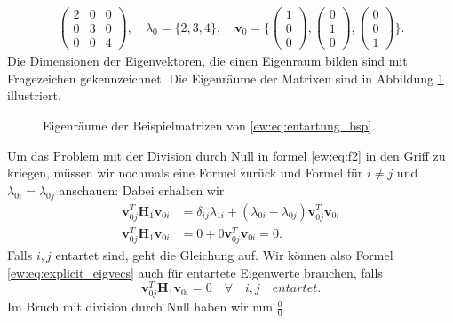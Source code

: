 \begin{align}
    \begin{pmatrix}
        2 & 0 & 0\\
        0 & 3 & 0\\
        0 & 0 & 4
    \end{pmatrix},
    \quad
    \lambda_0 = \{2, 3, 4\},
    \quad
    \bm v_0 = \{
    \begin{pmatrix}
        1\\
        0\\
        0
    \end{pmatrix},
    \begin{pmatrix}
        0\\
        1\\
        0
    \end{pmatrix},
    \begin{pmatrix}
        0\\
        0\\
        1
    \end{pmatrix}
    \}.
\end{align} \label{ew:eq:entartung_bsp}
Die Dimensionen der Eigenvektoren, die einen Eigenraum bilden sind mit Fragezeichen gekennzeichnet.
Die Eigenräume der Matrixen sind in Abbildung \ref{ew:fig:entartung} illustriert.

\begin{figure}
    \begin{center}
        
    \end{center}
    \caption{Eigenräume der Beispielmatrizen von \ref{ew:eq:entartung_bsp}. }
    \label{ew:fig:entartung}
\end{figure}

Um das Problem mit der Division durch Null in formel \ref{ew:eq:f2} in den Griff zu kriegen, müssen wir nochmals eine Formel zurück und Formel \label{ew:eq:f} für $i \neq j$ und $\lambda_{0i} = \lambda_{0j}$ anschauen:
Dabei erhalten wir
\begin{align}
    \bm v_{0j}^T \bm H_1 \bm v_{0i}
    &=
    \delta_{ij} \lambda_{1i} + 
    ( \lambda_{0i} - \lambda_{0j} )
    \bm v_{0j}^T  \bm v_{0i}
    \\
    \bm v_{0j}^T \bm H_1 \bm v_{0i}
    &=
    0 +
    0
    \bm v_{0j}^T  \bm v_{0i}
    = 0.
\end{align}
Falls $i, j$ entartet sind, geht die Gleichung auf. Wir können also Formel \ref{ew:eq:explicit_eigvecs} auch für entartete Eigenwerte brauchen, falls %
\begin{equation}
    \bm v_{0j}^T \bm H_1 \bm v_{0i} = 0 \quad \forall \quad i,j \quad entartet.
\end{equation} \label{ew:eq:condition-degenerated}
Im Bruch mit division durch Null haben wir nun $\frac{0}{0}$.

